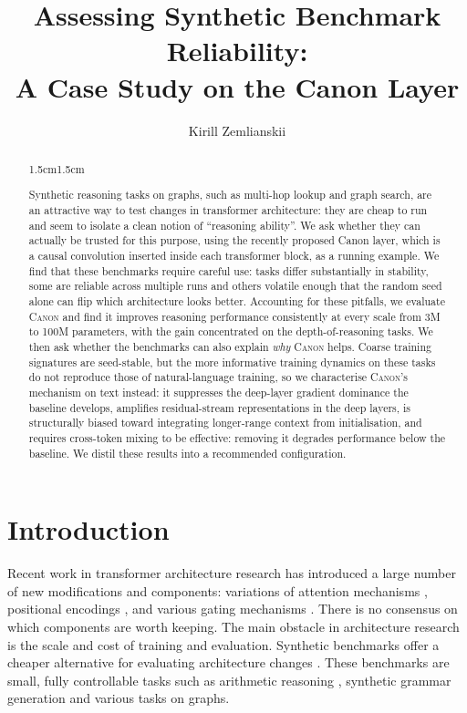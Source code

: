 \documentclass[11pt]{article}
\title{Assessing Synthetic Benchmark Reliability:\\
A Case Study on the Canon Layer}
\author{Kirill Zemlianskii}
\date{}
\newcommand{\Canon}{\textsc{Canon}\xspace}
\begin{document}
\maketitle

\begin{abstract}
\begin{adjustwidth}{1.5cm}{1.5cm}

Synthetic reasoning tasks on graphs, such as multi-hop lookup and graph
search, are an attractive way to test changes in transformer architecture: they are cheap
to run and seem to isolate a clean notion of ``reasoning ability''. We ask whether
they can actually be trusted for this purpose, using the recently proposed Canon
layer, which is a causal convolution inserted inside each
transformer block, as a running example.
We find that these benchmarks require careful use: tasks differ substantially in
stability, some are reliable across multiple runs and others volatile
enough that the random seed alone can flip which architecture looks better.
Accounting for these pitfalls, we evaluate \Canon and find it improves reasoning performance consistently at every scale from 3M to 100M parameters, with the gain concentrated on the depth-of-reasoning tasks.
We then ask whether the benchmarks can also explain \emph{why} \Canon helps. Coarse training signatures are seed-stable, but the more informative training dynamics on these tasks do not reproduce those of natural-language training, so we characterise \Canon's mechanism on text instead: it suppresses the deep-layer gradient dominance the baseline develops, amplifies residual-stream representations in the deep layers, is structurally biased toward integrating longer-range context from initialisation, and requires cross-token mixing to be effective: removing it degrades performance below the baseline. We distil these results into a recommended configuration.

\end{adjustwidth}
\end{abstract}

\section{Introduction}

Recent work in transformer architecture research has introduced a large number of new modifications and components: variations of attention mechanisms \citep{deepseek2024v2, yang2023gla}, positional encodings \citep{su2021roformer, kazemnejad2023nope, press2022alibi}, and various gating mechanisms \citep{shazeer2020glu, shazeer2017moe, fedus2022switch}.
There is no consensus on which components are worth keeping.
The main obstacle in architecture research is the scale and cost of training and evaluation.
Synthetic benchmarks offer a cheaper alternative for evaluating architecture changes \citep{allen-zhu2023physics1, allen-zhu2024physics31, allen-zhu2023physics32, allen-zhu2025physics33}.
These benchmarks are small, fully controllable tasks such as arithmetic reasoning \citep{ye2024physics21}, synthetic grammar generation and various tasks on graphs.
\end{document}
